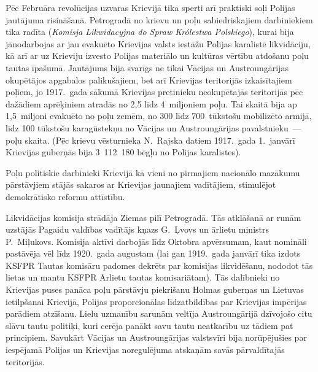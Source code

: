 \documentclass[twoside,a5paper,12pt,fleqn,openany]{extbook}
\newcommand{\pltxti}[1]{\textit{\textpolish{#1}}}
\begin{document}
Pēc Februāra revolūcijas uzvaras Krievijā tika sperti arī praktiski soļi Polijas jautājuma risināšanā. Petrogradā no krievu un poļu sabiedriskajiem darbiniekiem tika radīta  (\pltxti{Komisja Likwidacyjna do Spraw Królestwa Polskiego}), kurai bija jānodarbojas ar jau evakuēto Krievijas valsts iestāžu Polijas karalistē likvidāciju, kā arī ar uz Krieviju izvesto Polijas materiālo un kultūras vērtību atdošanu poļu tautas īpašumā. Jautājums bija svarīgs ne tikai Vācijas un Austroungārijas okupētājos apgabalos palikušajiem, bet arī Krievijas teritorijās izkaisītajiem poļiem, jo 1917.~gada sākumā Krievijas pretinieku neokupētajās teritorijās pēc dažādiem aprēķiniem atradās no 2,5 līdz 4~miljoniem poļu. Tai skaitā bija ap 1,5~miljoni evakuēto no poļu zemēm, no 300 līdz 700~tūkstošu mobilizēto armijā, līdz 100 tūkstošu karagūstekņu no Vācijas un Austroungārijas pavalstnieku~--- poļu skaita. (Pēc krievu vēsturnieka N.~Rajska datiem 1917.~gada 1.~janvārī Krievijas guberņās bija 3~112~180 bēgļu no Polijas karalistes).

Poļu politiskie darbinieki Krievijā kā vieni no pirmajiem nacionālo mazākumu pārstāvjiem stājās sakaros ar Krievijas jaunajiem vadītājiem, stimulējot demokrātisko reformu attīstību.

Likvidācijas komisija strādāja Ziemas pilī Petrogradā. Tās atklāšanā ar runām uzstājās Pagaidu valdības vadītājs kņazs G.~Ļvovs un ārlietu ministrs P.~Miļukovs. Komisija aktīvi darbojās līdz Oktobra apvērsumam, kaut nomināli pastāvēja vēl līdz 1920.~gada augustam (lai gan 1919.~gada janvārī tika izdots KSFPR Tautas komisāru padomes dekrēts par komisijas likvidēšanu, nododot tās lietas un mantu KSFPR Ārlietu tautas komisariātam). Tās dalībnieki no Krievijas puses panāca poļu pārstāvju piekrišanu Holmas guberņas un Lietuvas ietilpšanai Krievijā, Polijas proporcionālas līdzatbildības par Krievijas impērijas parādiem atzīšanu. Lielu uzmanību sarunām veltīja Austroungārijā dzīvojošo citu slāvu tautu politiķi, kuri cerēja panākt savu tautu neatkarību uz tādiem pat principiem. Savukārt Vācijas un Austroungārijas valstsvīri bija norūpējušies par iespējamā Polijas un Krievijas noregulējuma atskaņām savās pārvaldītajās teritorijās.
\end{document}
